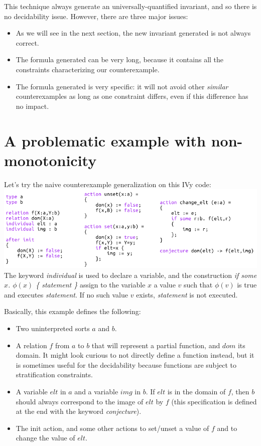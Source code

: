 \documentclass[11pt,a4paper,oldfontcommands,openany]{memoir}
\begin{document}
    This technique always generate an universally-quantified invariant, and so there is no decidability issue.
    However, there are three major issues:
    \begin{itemize}
        \item As we will see in the next section, the new invariant generated is not always correct.
        \item The formula generated can be very long, because it contains all the constraints characterizing our counterexample.
        \item The formula generated is very specific: it will not avoid other \textit{similar} counterexamples as long as
        one constraint differs, even if this difference has no impact.
    \end{itemize}

    \section{A problematic example with non-monotonicity}

    Let's try the naive counterexample generalization on this IVy code:\\

    \includegraphics[width=15cm]{NonMonotonicExLarge}
    \\
    The keyword \textit{individual} is used to declare a variable, and the construction \textit{if some \(x\). \(\phi(x)\) \{ statement \}}
    assign to the variable \(x\) a value \(v\) such that \(\phi(v)\) is true and executes \textit{statement}. If no such value \(v\) exists,
    \textit{statement} is not executed.

    Basically, this example defines the following:
    \begin{itemize}
        \item Two uninterpreted sorts \(a\) and \(b\).
        \item A relation \(f\) from \(a\) to \(b\) that will represent a partial function, and \(dom\) its domain. It might look curious to not directly define a function instead,
        but it is sometimes useful for the decidability because functions are subject to stratification constraints.
        \item A variable \(elt\) in \(a\) and a variable \(img\) in \(b\). If \(elt\) is in the domain of \(f\), then \(b\) should always
        correspond to the image of \(elt\) by \(f\) (this specification is defined at the end with the keyword \textit{conjecture}).
        \item The init action, and some other actions to set/unset a value of \(f\) and to change the value of \(elt\).
    \end{itemize}
\end{document}
